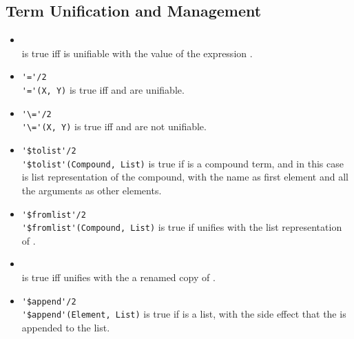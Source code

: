 \subsection{Term Unification and Management}

\begin{itemize}
%
\item {}\\
\noindent{} is true iff  is unifiable with the
value of the expression .\\
\noindent{}
%
\item \verb|'='/2|\\
\noindent\verb|'='(X, Y)| is true iff  and  are
unifiable.\\
\noindent{}
%
\item \verb|'\='/2|\\
\noindent\verb|'\='(X, Y)| is true iff  and  are
not unifiable. \\
\noindent{}
%
%
\item \verb|'$tolist'/2|\\
\noindent\verb|'$tolist'(Compound, List)| is true if  is
a compound term, and in this case  is list representation
of the compound, with the name as first element and all the
arguments as other elements.\\
\noindent{}
%
 \item \verb|'$fromlist'/2|\\
 \noindent\verb|'$fromlist'(Compound, List)| is true if 
 unifies with the list representation of .\\
\noindent{}
%
 \item {}\\
 \noindent{} is true iff 
 unifies with the a renamed copy of .\\
\noindent{}
%
 \item \verb|'$append'/2|\\
 \noindent\verb|'$append'(Element, List)| is true if  is a
 list, with the side effect that the  is appended to
 the list.\\
\noindent{}
%
\end{itemize}

